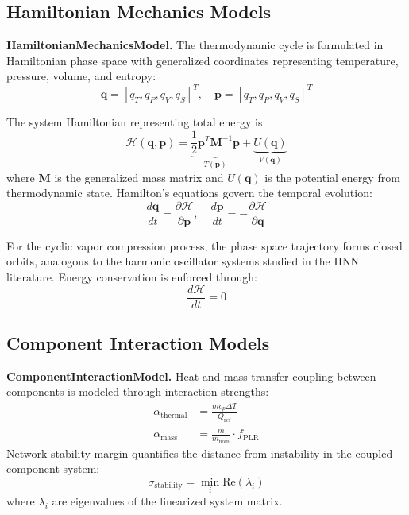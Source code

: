 \documentclass[11pt]{article}
\begin{document}
\subsection{Hamiltonian Mechanics Models}

\textbf{HamiltonianMechanicsModel.} The thermodynamic cycle is formulated in Hamiltonian phase space with generalized coordinates representing temperature, pressure, volume, and entropy:
\begin{equation}
\mathbf{q} = [q_T, q_P, q_V, q_S]^T, \quad \mathbf{p} = [\dot{q}_T, \dot{q}_P, \dot{q}_V, \dot{q}_S]^T
\end{equation}

The system Hamiltonian representing total energy is:
\begin{equation}
\mathcal{H}(\mathbf{q}, \mathbf{p}) = \underbrace{\frac{1}{2}\mathbf{p}^T \mathbf{M}^{-1} \mathbf{p}}_{T(\mathbf{p})} + \underbrace{U(\mathbf{q})}_{V(\mathbf{q})}
\end{equation}
where $\mathbf{M}$ is the generalized mass matrix and $U(\mathbf{q})$ is the potential energy from thermodynamic state. Hamilton's equations govern the temporal evolution:
\begin{equation}
\frac{d\mathbf{q}}{dt} = \frac{\partial \mathcal{H}}{\partial \mathbf{p}}, \quad \frac{d\mathbf{p}}{dt} = -\frac{\partial \mathcal{H}}{\partial \mathbf{q}}
\end{equation}

For the cyclic vapor compression process, the phase space trajectory forms closed orbits, analogous to the harmonic oscillator systems studied in the HNN literature. Energy conservation is enforced through:
\begin{equation}
\frac{d\mathcal{H}}{dt} = 0
\end{equation}

\subsection{Component Interaction Models}

\textbf{ComponentInteractionModel.} Heat and mass transfer coupling between components is modeled through interaction strengths:
\begin{align}
\alpha_{\text{thermal}} &= \frac{\dot{m} c_p \Delta T}{Q_{\text{ref}}} \\
\alpha_{\text{mass}} &= \frac{\dot{m}}{\dot{m}_{\text{nom}}} \cdot f_{\text{PLR}}
\end{align}
Network stability margin quantifies the distance from instability in the coupled component system:
\begin{equation}
\sigma_{\text{stability}} = \min_i \text{Re}(\lambda_i)
\end{equation}
where $\lambda_i$ are eigenvalues of the linearized system matrix.
\end{document}
